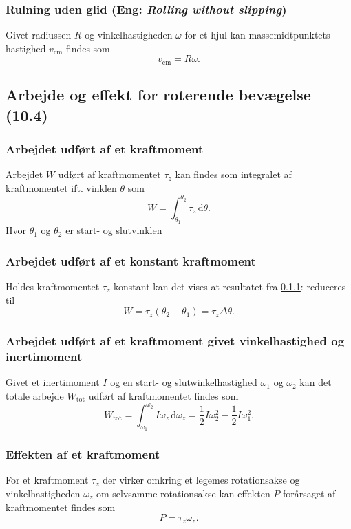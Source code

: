 \subsubsection{Rulning uden glid (Eng: \textit{Rolling without slipping})} \label{afs:ruluglid}
Givet radiussen $R$ og vinkelhastigheden $\omega$ for et hjul kan massemidtpunktets hastighed $v_{\text{cm}}$ findes som 
\[ 
v_{\text{cm}} = R\omega
.\]


\subsection{Arbejde og effekt for roterende bevægelse (10.4)}

\subsubsection{Arbejdet udført af et kraftmoment} \label{afs:wortor}
Arbejdet $W$ udført af kraftmomentet $\tau_z$ kan findes som integralet af kraftmomentet ift. vinklen $\theta$ som
\[ 
W = \int_{\theta_1}^{\theta_2} \tau_z \, \mathrm{d}\theta
.\]
Hvor $\theta_1$ og $\theta_2$ er start- og slutvinklen


\subsubsection{Arbejdet udført af et konstant kraftmoment} \label{afs:wortorkon}
Holdes kraftmomentet $\tau_z$ konstant kan det vises at resultatet fra \ref{afs:wortor}:  reduceres til
\[ 
W = \tau_z (\theta_2 - \theta_1) = \tau_z \Delta \theta
.\]


\subsubsection{Arbejdet udført af et kraftmoment givet vinkelhastighed og inertimoment} \label{afs:wortorvinhasinemom}
Givet et inertimoment $I$ og en start- og slutwinkelhastighed $\omega_1$ og $\omega_2$ kan det totale arbejde $W_{\text{tot}}$ udført af kraftmomentet findes som
\[ 
W_{\text{tot}} = \int_{\omega_1}^{\omega_2} I\omega_z \, \mathrm{d}\omega_z = \frac{1}{2}I \omega_2^2 - \frac{1}{2}I\omega_1^2
.\]


\subsubsection{Effekten af et kraftmoment} \label{afs:effkramom}
For et kraftmoment $\tau_z$ der virker omkring et legemes rotationsakse og vinkelhastigheden $\omega_z$ om selvsamme rotationsakse kan effekten $P$ forårsaget af kraftmomentet findes som
\[ 
P = \tau_z \omega_z
.\]

